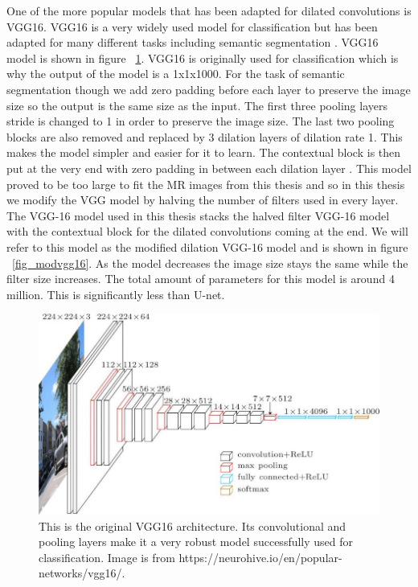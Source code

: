  
 One of the more popular models that has been adapted for dilated convolutions is VGG16. 
 VGG16 is a very widely used model for classification but has been adapted for many different tasks including semantic segmentation \cite{Simonyan15}. 
 VGG16 model is shown in figure ~\ref{fig_vgg16}. 
 VGG16 is originally used for classification which is why the output of the model is a 1x1x1000. 
 For the task of semantic segmentation though we add zero padding before each layer to preserve the image size so the output is the same size as the input. 
 The first three pooling layers stride is changed to 1 in order to preserve the image size. 
 The last two pooling blocks are also removed and replaced by 3 dilation layers of dilation rate 1. 
 This makes the model simpler and easier for it to learn. 
 The contextual block is then put at the very end with zero padding in between each dilation layer \cite{Yu2016MultiScaleCA}. 
 This model proved to be too large to fit the MR images from this thesis and so in this thesis we modify the VGG model by halving the number of filters used in every layer. 
 The VGG-16 model used in this thesis stacks the halved filter VGG-16 model with the contextual block for the dilated convolutions coming at the end. 
 We will refer to this model as the modified dilation VGG-16 model and is shown in figure ~\ref{fig_modvgg16}.
 As the model decreases the image size stays the same while the filter size increases.
 The total amount of parameters for this model is around 4 million. 
 This is significantly less than U-net. 
 
 \begin{figure}[tbh]
\centering
\includegraphics[width=\textwidth]{vgg16-neural-network.jpg}
\caption{ This is the original VGG16 architecture. Its convolutional and pooling layers make it a very robust model successfully used for classification. Image is from https://neurohive.io/en/popular-networks/vgg16/.}
\label{fig_vgg16}
\end{figure}
 
